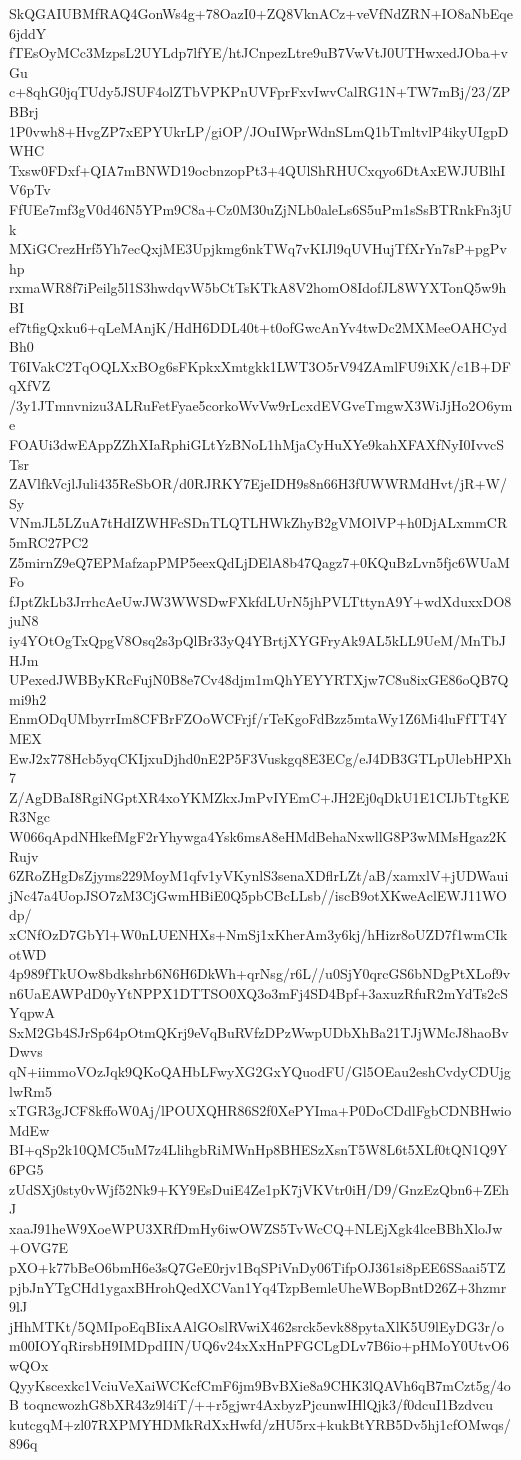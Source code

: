 SkQGAIUBMfRAQ4GonWs4g+78OazI0+ZQ8VknACz+veVfNdZRN+IO8aNbEqe6jddY
fTEsOyMCc3MzpsL2UYLdp7lfYE/htJCnpezLtre9uB7VwVtJ0UTHwxedJOba+vGu
c+8qhG0jqTUdy5JSUF4olZTbVPKPnUVFprFxvIwvCalRG1N+TW7mBj/23/ZPBBrj
1P0vwh8+HvgZP7xEPYUkrLP/giOP/JOuIWprWdnSLmQ1bTmltvlP4ikyUIgpDWHC
Txsw0FDxf+QIA7mBNWD19ocbnzopPt3+4QUlShRHUCxqyo6DtAxEWJUBlhIV6pTv
FfUEe7mf3gV0d46N5YPm9C8a+Cz0M30uZjNLb0aleLs6S5uPm1sSsBTRnkFn3jUk
MXiGCrezHrf5Yh7ecQxjME3Upjkmg6nkTWq7vKIJl9qUVHujTfXrYn7sP+pgPvhp
rxmaWR8f7iPeilg5l1S3hwdqvW5bCtTsKTkA8V2homO8IdofJL8WYXTonQ5w9hBI
ef7tfigQxku6+qLeMAnjK/HdH6DDL40t+t0ofGwcAnYv4twDc2MXMeeOAHCydBh0
T6IVakC2TqOQLXxBOg6sFKpkxXmtgkk1LWT3O5rV94ZAmlFU9iXK/c1B+DFqXfVZ
/3y1JTmnvnizu3ALRuFetFyae5corkoWvVw9rLcxdEVGveTmgwX3WiJjHo2O6yme
FOAUi3dwEAppZZhXIaRphiGLtYzBNoL1hMjaCyHuXYe9kahXFAXfNyI0IvvcSTsr
ZAVlfkVcjlJuli435ReSbOR/d0RJRKY7EjeIDH9s8n66H3fUWWRMdHvt/jR+W/Sy
VNmJL5LZuA7tHdIZWHFcSDnTLQTLHWkZhyB2gVMOlVP+h0DjALxmmCR5mRC27PC2
Z5mirnZ9eQ7EPMafzapPMP5eexQdLjDElA8b47Qagz7+0KQuBzLvn5fjc6WUaMFo
fJptZkLb3JrrhcAeUwJW3WWSDwFXkfdLUrN5jhPVLTttynA9Y+wdXduxxDO8juN8
iy4YOtOgTxQpgV8Osq2s3pQlBr33yQ4YBrtjXYGFryAk9AL5kLL9UeM/MnTbJHJm
UPexedJWBByKRcFujN0B8e7Cv48djm1mQhYEYYRTXjw7C8u8ixGE86oQB7Qmi9h2
EnmODqUMbyrrIm8CFBrFZOoWCFrjf/rTeKgoFdBzz5mtaWy1Z6Mi4luFfTT4YMEX
EwJ2x778Hcb5yqCKIjxuDjhd0nE2P5F3Vuskgq8E3ECg/eJ4DB3GTLpUlebHPXh7
Z/AgDBaI8RgiNGptXR4xoYKMZkxJmPvIYEmC+JH2Ej0qDkU1E1CIJbTtgKER3Ngc
W066qApdNHkefMgF2rYhywga4Ysk6msA8eHMdBehaNxwllG8P3wMMsHgaz2KRujv
6ZRoZHgDsZjyms229MoyM1qfv1yVKynlS3senaXDflrLZt/aB/xamxlV+jUDWaui
jNc47a4UopJSO7zM3CjGwmHBiE0Q5pbCBcLLsb//iscB9otXKweAclEWJ11WOdp/
xCNfOzD7GbYl+W0nLUENHXs+NmSj1xKherAm3y6kj/hHizr8oUZD7f1wmCIkotWD
4p989fTkUOw8bdkshrb6N6H6DkWh+qrNsg/r6L//u0SjY0qrcGS6bNDgPtXLof9v
n6UaEAWPdD0yYtNPPX1DTTSO0XQ3o3mFj4SD4Bpf+3axuzRfuR2mYdTs2cSYqpwA
SxM2Gb4SJrSp64pOtmQKrj9eVqBuRVfzDPzWwpUDbXhBa21TJjWMcJ8haoBvDwvs
qN+iimmoVOzJqk9QKoQAHbLFwyXG2GxYQuodFU/Gl5OEau2eshCvdyCDUjglwRm5
xTGR3gJCF8kffoW0Aj/lPOUXQHR86S2f0XePYIma+P0DoCDdlFgbCDNBHwioMdEw
BI+qSp2k10QMC5uM7z4LlihgbRiMWnHp8BHESzXsnT5W8L6t5XLf0tQN1Q9Y6PG5
zUdSXj0sty0vWjf52Nk9+KY9EsDuiE4Ze1pK7jVKVtr0iH/D9/GnzEzQbn6+ZEhJ
xaaJ91heW9XoeWPU3XRfDmHy6iwOWZS5TvWcCQ+NLEjXgk4lceBBhXloJw+OVG7E
pXO+k77bBeO6bmH6e3sQ7GeE0rjv1BqSPiVnDy06TifpOJ361si8pEE6SSaai5TZ
pjbJnYTgCHd1ygaxBHrohQedXCVan1Yq4TzpBemleUheWBopBntD26Z+3hzmr9lJ
jHhMTKt/5QMIpoEqBIixAAlGOslRVwiX462srck5evk88pytaXlK5U9lEyDG3r/o
m00IOYqRirsbH9IMDpdIIN/UQ6v24xXxHnPFGCLgDLv7B6io+pHMoY0UtvO6wQOx
QyyKscexkc1VciuVeXaiWCKcfCmF6jm9BvBXie8a9CHK3lQAVh6qB7mCzt5g/4oB
toqncwozhG8bXR43z9l4iT/++r5gjwr4AxbyzPjcunwIHlQjk3/f0dcuI1Bzdvcu
kutcgqM+zl07RXPMYHDMkRdXxHwfd/zHU5rx+kukBtYRB5Dv5hj1cfOMwqs/896q
